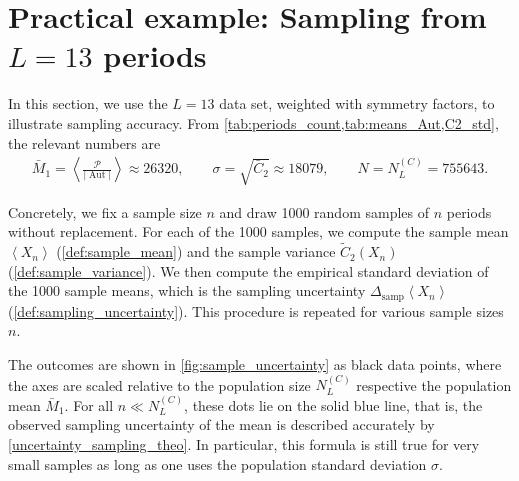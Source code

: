 \documentclass[11pt,a4paper]{article}
\newcommand{\abs}[1]{\lvert #1 \rvert}
\newcommand{\period}{\mathcal P}
\newcommand{\Aut}{\operatorname{Aut}}
\renewcommand{\|}{\rule[-0.4ex]{0.2ex}{1.2em}}
\begin{document}
\section{Practical example: Sampling from $L=13$ periods} \label{sec:sampling_example}
In this section, we use the $L=13$ data set, weighted with symmetry factors, to illustrate sampling accuracy.  From \cref{tab:periods_count,tab:means_Aut,C2_std}, the relevant numbers are
\begin{align*}
	\bar M_1=  \left \langle 	\frac{\period}{\abs{\Aut}} \right \rangle  \approx26320 , \qquad \sigma =\sqrt{\bar C_2}\approx 18079, \qquad N=N^{(C)}_L=755643.
\end{align*}

Concretely, we fix a sample size $n$ and draw 1000 random samples of $n$ periods without replacement. For each of the 1000 samples, we compute the sample mean $ \left \langle  X_n  \right \rangle  $ (\cref{def:sample_mean}) and the sample variance $\tilde C_2(X_n)$ (\cref{def:sample_variance}). We then compute the empirical standard deviation of the 1000 sample means, which is the sampling uncertainty $\Delta_{\text{samp}} \left \langle X_n \right \rangle $ (\cref{def:sampling_uncertainty}). This procedure is repeated for various sample sizes $n$. 



The outcomes are shown in \cref{fig:sample_uncertainty} as black data points, where the axes are scaled relative to the population size $N^{(C)}_L$ respective the population mean $\bar M_1$. For all $n \ll N^{(C)}_L$,   these dots lie on the solid blue line, that is, the observed sampling uncertainty of the mean is described accurately by \cref{uncertainty_sampling_theo}. In particular, this formula is still true for very small samples as long as one uses the population standard deviation $\sigma$. 
\end{document}
